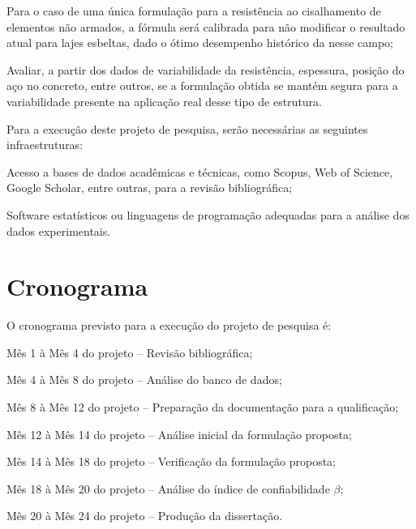 \begin{alineas}
    \item Para o caso de uma única formulação para a resistência ao cisalhamento de elementos não armados, a fórmula será calibrada para não modificar o resultado atual para lajes esbeltas, dado o ótimo desempenho histórico da \textcite{NBR6118:2023} nesse campo;
    \item Avaliar, a partir dos dados de variabilidade da resistência, espessura, posição do aço no concreto, entre outros, se a formulação obtida se mantém segura para a variabilidade presente na aplicação real desse tipo de estrutura.
\end{alineas}
Para a execução deste projeto de pesquisa, serão necessárias as seguintes infraestruturas:
\begin{alineas}
    \item Acesso a bases de dados acadêmicas e técnicas, como Scopus, Web of Science, Google Scholar, entre outras, para a revisão bibliográfica;
    \item Software estatísticos ou linguagens de programação adequadas para a análise dos dados experimentais.
\end{alineas}

\chapter{Cronograma}

O cronograma previsto para a execução do projeto de pesquisa é:

\begin{alineas}
    \item Mês 1 à Mês 4 do projeto -- Revisão bibliográfica;
    \item Mês 4 à Mês 8 do projeto -- Análise do banco de dados;
    \item Mês 8 à Mês 12 do projeto -- Preparação da documentação para a qualificação;
    \item Mês 12 à Mês 14 do projeto -- Análise inicial da formulação proposta;
    \item Mês 14 à Mês 18 do projeto -- Verificação da formulação proposta;
    \item Mês 18 à Mês 20 do projeto -- Análise do índice de confiabilidade $\beta$;
    \item Mês 20 à Mês 24 do projeto -- Produção da dissertação.
\end{alineas}

